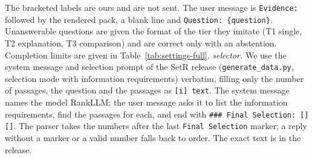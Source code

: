 The bracketed labels are ours and are not sent. The user message is \texttt{Evidence:} followed by the rendered pack, a blank line and \texttt{Question: \{question\}}. Unanswerable questions are given the format of the tier they imitate (T1 single, T2 explanation, T3 comparison) and are correct only with an abstention. Completion limits are given in Table~\ref{tab:settings-full}.
\emph{\setr{} selector.} We use the system message and selection prompt of the SetR release (\texttt{generate\_data.py}, selection mode with information requirements) verbatim, filling only the number of passages, the question and the passages as \texttt{[i] text}. The system message names the model RankLLM; the user message asks it to list the information requirements, find the passages for each, and end with \texttt{\#\#\# Final Selection: [] []}. The parser takes the numbers after the last \texttt{Final Selection} marker; a reply without a marker or a valid number falls back to \hybrid{} order. The exact text is in the release.


